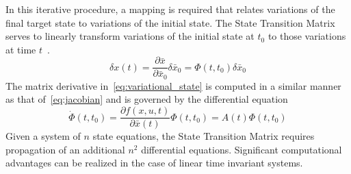 In this iterative procedure, a mapping is required that relates variations of the final target state to variations of the initial state.
The State Transition Matrix serves to linearly transform variations of the initial state at \( t_0\) to those variations at time \(t\)~\cite{slotine1991}.
\begin{equation}
	\delta x(t) = \frac{\partial \bar{x}}{\partial \bar{x}_0} \delta \bar{x}_0 = \Phi(t,t_0) \delta \bar{x}_0
	\label{eq:variational_state}
\end{equation}
The matrix derivative in~\eqref{eq:variational_state} is computed in a similar manner as that of~\eqref{eq:jacobian} and is governed by the differential equation
\begin{equation}
	\dot{\Phi}(t,t_0) = \frac{\partial f(x, u , t)}{\partial \bar{x}(t)} \Phi(t,t_0) = A(t) \Phi(t,t_0)
	\label{eq:stm}
\end{equation}
Given a system of \(n\) state equations, the State Transition Matrix requires propagation of an additional \(n^2\) differential equations. 
Significant computational advantages can be realized in the case of linear time invariant systems.

